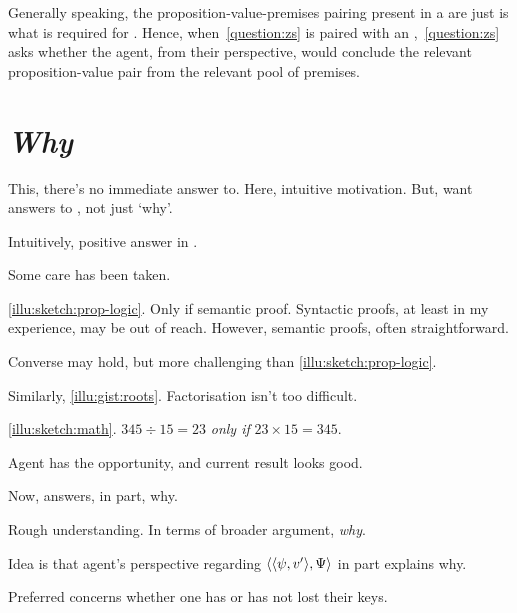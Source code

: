 \begin{note}[In general]
  Generally speaking, the proposition-value-premises pairing present in a  are just is what is required for \requ{}.
  Hence, when~\autoref{question:zs} is paired with an ,~\autoref{question:zs} asks whether the agent, from their perspective, would conclude the relevant proposition-value pair from the relevant pool of premises.
\end{note}

\section{\emph{Why}}
\label{cha:zS:section:qzs-and-why}

\begin{note}
  \color{red}
  This, there's no immediate answer to.
  Here, intuitive motivation.
  But, want answers to \qWhyV{}, not just `why'.
\end{note}

\begin{note}
  Intuitively, positive answer in .

  Some care has been taken.

  \autoref{illu:sketch:prop-logic}.
  Only if semantic proof.
  Syntactic proofs, at least in my experience, may be out of reach.
  However, semantic proofs, often straightforward.

  Converse may hold, but more challenging than \autoref{illu:sketch:prop-logic}.

  Similarly, \autoref{illu:gist:roots}.
  Factorisation isn't too difficult.

  \autoref{illu:sketch:math}.
  \(345 \div 15 = 23\) \emph{only if} \(23 \times 15 = 345\).

  Agent has the opportunity, and current result looks good.
\end{note}

\begin{note}
  Now, answers, in part, why.
\end{note}

\begin{note}
  Rough understanding.
  In terms of broader argument, \emph{why}.

  Idea is that agent's perspective regarding \(\langle \langle \psi, v' \rangle, \Psi \rangle\) in part explains why.

  Preferred  concerns whether one has or has not lost their keys.
\end{note}

